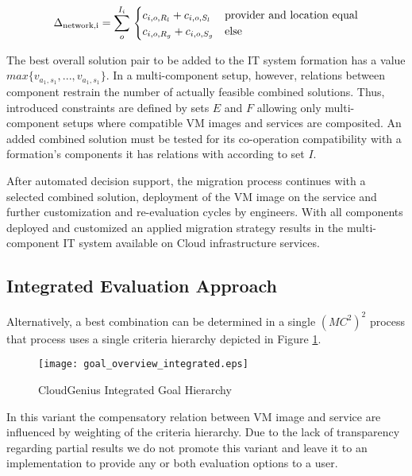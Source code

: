 \documentclass[10pt]{article}
\begin{document}
\begin{equation}\label{function-network-traffic-delta}
\Delta_{\text{network,i}} = \sum^{I_i}_{o}\\
\begin{cases}
c_{i,o,R_l} + c_{i,o,S_l} & \text{provider and location equal}\\
c_{i,o,R_g} + c_{i,o,S_g} & \text{else}\\
\end{cases}
\end{equation}

The best overall solution pair to be added to the IT system formation has a value $max \{v_{a_1,s_1},...,v_{a_1,s_1}\}$. In a multi-component setup, however, relations between component restrain the number of actually feasible combined solutions. Thus, introduced constraints are defined by sets $E$ and $F$ allowing only multi-component setups where compatible VM images and services are composited. An added combined solution must be tested for its co-operation compatibility with a formation's components it has relations with according to set $I$.

After automated decision support, the migration process continues with a selected combined solution, deployment of the VM image on the service and further customization and re-evaluation cycles by engineers. With all components deployed and customized an applied migration strategy results in the multi-component IT system available on Cloud infrastructure services.

\subsection{Integrated Evaluation Approach}

Alternatively, a best combination can be determined in a single $(MC^2)^2$ process that process uses a single criteria hierarchy depicted in Figure \ref{overview-goals-integrated}. 

\begin{figure}[h]
\centering
\texttt{[image: goal\_overview\_integrated.eps]} 
\caption{CloudGenius Integrated Goal Hierarchy}\label{overview-goals-integrated}
\end{figure}

In this variant the compensatory relation between VM image and service are influenced by weighting of the criteria hierarchy. Due to the lack of transparency regarding partial results we do not promote this variant and leave it to an implementation to provide any or both evaluation options to a user.
\end{document}

